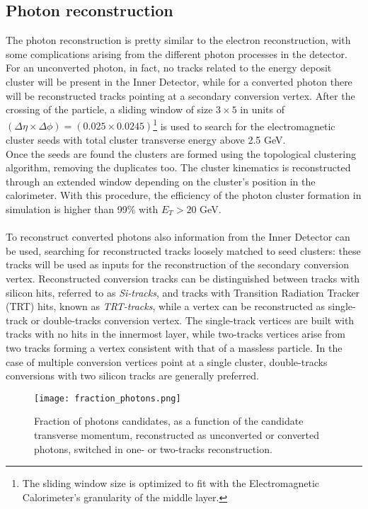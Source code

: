 \subsection{Photon reconstruction}
The photon reconstruction \cite{Aaboud_2016yuq, Aaboud_2018yqu} is pretty similar to the electron reconstruction, with some complications arising from the different photon processes in the detector. For an unconverted photon, in fact, no tracks related to the energy deposit cluster will be present in the Inner Detector, while for a converted photon there will be reconstructed tracks pointing at a secondary conversion vertex. After the crossing of the particle, a sliding window of size $3 \times 5$ in units of $(\Delta \eta \times \Delta \phi) = (0.025 \times 0.0245)$\footnote{The sliding window size is optimized to fit with the Electromagnetic Calorimeter's granularity of the middle layer.}
is used to search for the electromagnetic cluster seeds with total cluster transverse energy above 2.5 GeV.
\\
Once the seeds are found the clusters are formed using the topological clustering algorithm, removing the duplicates too. The cluster kinematics is reconstructed through an extended window depending on the cluster's position in the calorimeter. With this procedure, the efficiency of the photon cluster formation in simulation is higher than 99\% with $E_T > 20$ GeV.
\\\\
To reconstruct converted photons also information from the Inner Detector can be used, searching for reconstructed tracks loosely matched to seed clusters: these tracks will be used as inputs for the reconstruction of the secondary conversion vertex. Reconstructed conversion tracks can be distinguished between tracks with silicon hits, referred to as \emph{Si-tracks}, and tracks with Transition Radiation Tracker (TRT) hits, known as \emph{TRT-tracks}, while a vertex can be reconstructed as single-track or double-tracks conversion vertex. The single-track vertices are built with tracks with no hits in the innermost layer, while two-tracks vertices arise from two tracks forming a vertex consistent with that of a massless particle. In the case of multiple conversion vertices point at a single cluster, double-tracks conversions with two silicon tracks are generally preferred.
\begin{figure}[t]
\centering
\texttt{[image: fraction\_photons.png]}
\caption{Fraction of photons candidates, as a function of the candidate transverse momentum, reconstructed as unconverted or converted photons, switched in one- or two-tracks reconstruction.}
\end{figure}
